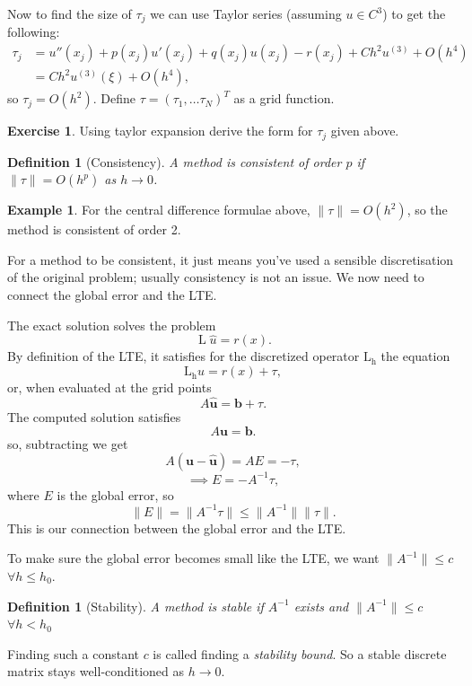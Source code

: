 \documentclass[12pt, a4paper]{article}
\newtheorem{definition}[thm]{Definition}
\theoremstyle{definition}
\newtheorem{example}[thm]{Example}
\newtheorem{exercise}[thm]{Exercise}
\theoremstyle{remark}
\numberwithin{equation}{section}
\begin{document}
%

Now to find the size of $\tau_j$ we can use Taylor series (assuming $u \in C^3$) to get the following: 
\begin{align*}
\tau_j&=u''(x_j)+p(x_j)u'(x_j)+q(x_j)u(x_j)-r(x_j)+ C h^2u^{(3)}+O(h^4)\\
&=C h^2u^{(3)}(\xi)+O(h^4),
\end{align*}
so $\tau_j = O(h^2)$.
Define $\tau = (\tau_1, \dots \tau_N)^T$ as a grid function. 

\begin{exercise}
 Using taylor expansion derive the form for $\tau_{j}$ given above.
\end{exercise}

\newpage

\begin{definition}[Consistency]
A method is consistent of order $p$ if \mbox{$\|\tau\| = O(h^p)$} as $h \to 0$.
\end{definition}

\begin{example}
 For the central difference formulae above, $\|\tau\| = O(h^2)$, so the method is consistent of order 2.
\end{example}

For a method to be consistent, it just means you've used a sensible discretisation of the original problem; usually consistency is not an issue. 
We now need to connect the global error and the LTE. 

The exact solution solves the problem 
\[  \operatorname{L} \hat{u} = r(x).\]
By definition of the LTE, it satisfies for the discretized operator $\operatorname{L_h}$ the equation
\[ \operatorname{L_h} \hat{u} = r(x) + \tau, \]
or, when evaluated at the grid points
\[ A  \mathbf{\hat{u}} = \mathbf{b} + \tau. \]
The computed solution satisfies 
\[  A  \mathbf{u} = \mathbf{b}.  \]
so, subtracting we get
\[ A(\mathbf{u} - \mathbf{\hat{u}}) = A E=-\tau,\]
\[ \implies E = -A^{-1}\tau, \] 
where $E$ is the global error, 
so \[\| E \| = \|A^{-1}\tau\| \le \|A^{-1}\|\|\tau\|.\]
This is our connection between the global error and the LTE. 

To make sure the global error becomes small like the LTE, we want $\|A^{-1}\| \le c$ $\forall h \le h_0$.

\begin{definition}[Stability]
A method is stable if $A^{-1}$ exists and \mbox{$\|A^{-1}\| \le c$} $\forall h < h_0$
\end{definition}
Finding such a constant $c$ is called finding a \emph{stability bound}. So a stable discrete matrix stays well-conditioned as $h \to 0$.
\end{document}
